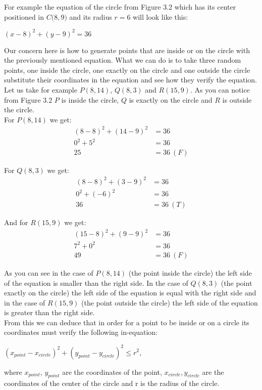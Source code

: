 For example the equation of the circle from Figure 3.2 which has its center positioned in $C\big(8, 9\big)$ and its radius $r = 6$ will look like this:

\begin{center}
	$(x - 8) ^ 2 + (y - 9) ^ 2 = 36$
\end{center}

\newpage
Our concern here is how to generate points that are inside or on the circle with the previously mentioned equation. What we can do is to take three random points, one inside the circle, one exactly on the circle and one outside the circle substitute their coordinates in the equation and see how they verify the equation. Let us take for example $P(8, 14)$, $Q(8, 3)$ and $R(15, 9)$. As you can notice from Figure 3.2 $P$ is inside the circle, $Q$ is exactly on the circle and $R$ is outside the circle.\\

For $P(8, 14)$ we get:
\begin{align*}
	(8 - 8) ^ 2 + (14 - 9) ^ 2 &= 36\\
	0 ^ 2 + 5 ^ 2 &= 36\\
	25 &= 36\ (F)
\end{align*}

For $Q(8, 3)$ we get:
\begin{align*}
(8 - 8) ^ 2 + (3 - 9) ^ 2 &= 36\\
0 ^ 2 + (-6) ^ 2 &= 36\\
36 &= 36\ (T)
\end{align*}

And for $R(15, 9)$ we get:
\begin{align*}
(15 - 8) ^ 2 + (9 - 9) ^ 2 &= 36\\
7 ^ 2 + 0 ^ 2 &= 36\\
49 &= 36\ (F)
\end{align*}

As you can see in the case of $P(8, 14)$ (the point inside the circle) the left side of the equation is smaller than the right side. In the case of $Q(8, 3)$ (the point exactly on the circle) the left side of the equation is equal with the right side and in the case of $R(15, 9)$ (the point outside the circle) the left side of the equation is greater than the right side.\\

From this we can deduce that in order for a point to be inside or on a circle its coordinates must verify the following in-equation:

\begin{center}
	$(x_{point} - x_{circle}) ^ 2 + (y_{point} - y_{circle}) ^ 2 \le r ^ 2$,
\end{center}
where $x_{point}$, $y_{point}$ are the coordinates of the point, $x_{circle}, y_{circle}$ are the coordinates of the center of the circle and r is the radius of the circle.\\

